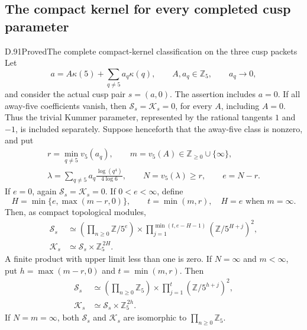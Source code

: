 \subsection{The compact kernel for every completed cusp parameter}

\begin{statement}{D.91}{Proved}{The complete compact-kernel classification on the three cusp packets}
Let
\[
 a=A\kappa(5)+\sum_{q\ne5}a_q\kappa(q),\qquad
 A,a_q\in\mathbb Z_5,\qquad a_q\longrightarrow0,
                                                               \tag{D.91.1}
\]
and consider the actual cusp pair \(s=(a,0)\). The assertion
includes \(a=0\). If all away-five coefficients vanish, then
\(\mathcal S_s=\mathcal K_s=0\), for every \(A\), including
\(A=0\). Thus the trivial Kummer parameter, represented by
the rational tangents \(1\) and \(-1\), is included separately.
Suppose henceforth that the away-five class is nonzero, and put
\[
 \begin{gathered}
 r=\min_{q\ne5}v_5(a_q),\qquad m=v_5(A)\in
                  \mathbb Z_{\ge0}\cup\{\infty\},\\
 \lambda=\sum_{q\ne5}a_q\frac{\log(q^4)}{4\log6},\qquad
 N=v_5(\lambda)\ge r,\qquad e=N-r.
 \end{gathered}                                                \tag{D.91.2}
\]
If \(e=0\), again \(\mathcal S_s=\mathcal K_s=0\).
If \(0<e<\infty\), define
\[
 H=\min\{e,\max(m-r,0)\},\qquad t=\min(m,r),
 \quad H=e\text{ when }m=\infty.
                                                               \tag{D.91.3}
\]
Then, as compact topological modules,
\[
 \begin{aligned}
 \mathcal S_s&\simeq
 \left(\prod_{n\ge0}\mathbb Z/5^e\right)
 \times\prod_{j=1}^{\min(t,e-H-1)}
                      (\mathbb Z/5^{H+j})^2,\\
 \mathcal K_s&\simeq\mathcal S_s\times\mathbb Z_5^{\,2H}.
 \end{aligned}                                                \tag{D.91.4}
\]
A finite product with upper limit less than one is zero.
If \(N=\infty\) and \(m<\infty\), put
\(h=\max(m-r,0)\) and \(t=\min(m,r)\). Then
\[
 \begin{aligned}
 \mathcal S_s&\simeq
 \left(\prod_{n\ge0}\mathbb Z_5\right)
          \times\prod_{j=1}^{t}(\mathbb Z/5^{h+j})^2,\\
 \mathcal K_s&\simeq\mathcal S_s\times\mathbb Z_5^{\,2h}.
 \end{aligned}                                                \tag{D.91.5}
\]
If \(N=m=\infty\), both \(\mathcal S_s\) and
\(\mathcal K_s\) are isomorphic to \(\prod_{n\ge0}\mathbb Z_5\).


\end{statement}
